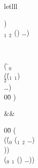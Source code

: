 \begin{optDefinition}
\begin{RewriteTable}{let}{lll}
\begin{minipage}[t]{\columnwidth}
\begin{tabbing}
    \>\>) \\
    \>$_1$ $_2$ () \ldots) \\
\end{tabbing}
\end{minipage}\\
\begin{minipage}[t]{\columnwidth}
\begin{tabbing}
    ( \= $_0$ \\
    \>(\=($_1$ $_1$) \\
    \>\>$_2$ \\
    \>\>\ldots)\\
    00\= \kill
    \>)
\end{tabbing}
\end{minipage}
&\rewrite&
\begin{minipage}[t]{\columnwidth}
\begin{tabbing}
    00\= \kill
    (\\
    \>(\=($_0$ ($_1$ $_2$ \ldots) \\
    \>\>)) \\
    \>($_0$ $_1$ () \ldots))
\end{tabbing}%
\end{minipage}%
\end{RewriteTable}


\end{optDefinition}
